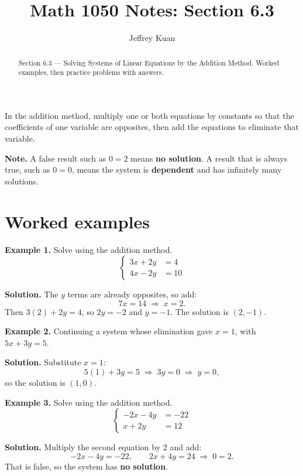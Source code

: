 \documentclass{ximera}
\author{Jeffrey Kuan}
\title{Math 1050 Notes: Section 6.3}
\begin{document}
\begin{abstract}
    Section 6.3 --- Solving Systems of Linear Equations by the Addition Method.
    Worked examples, then practice problems with answers.
\end{abstract}

\maketitle

In the addition method, multiply one or both equations by constants so that the
coefficients of one variable are opposites, then add the equations to eliminate that
variable.

\textbf{Note.} A false result such as $0=2$ means \textbf{no solution}. A result that is
always true, such as $0=0$, means the system is \textbf{dependent} and has infinitely
many solutions.

\section*{Worked examples}

\begin{problem}

\textbf{Example 1.} Solve using the addition method.
\[
  \left\{\begin{aligned}
    3x+2y &= 4 \\
    4x-2y &= 10
  \end{aligned}\right.
\]

\begin{hint}
\textbf{Solution.} The $y$ terms are already opposites, so add:
\[
  7x=14 \;\Longrightarrow\; x=2 .
\]
Then $3(2)+2y=4$, so $2y=-2$ and $y=-1$. The solution is $(2,-1)$.
\end{hint}
\end{problem}

\begin{problem}

\textbf{Example 2.} Continuing a system whose elimination gave $x=1$, with
$5x+3y=5$.

\begin{hint}
\textbf{Solution.} Substitute $x=1$:
\[
  5(1)+3y=5 \;\Longrightarrow\; 3y=0 \;\Longrightarrow\; y=0,
\]
so the solution is $(1,0)$.
\end{hint}
\end{problem}

\begin{problem}

\textbf{Example 3.} Solve using the addition method.
\[
  \left\{\begin{aligned}
    -2x-4y &= -22 \\
    x+2y &= 12
  \end{aligned}\right.
\]

\begin{hint}
\textbf{Solution.} Multiply the second equation by 2 and add:
\[
  -2x-4y=-22, \qquad 2x+4y=24 \;\Longrightarrow\; 0=2 .
\]
That is false, so the system has \textbf{no solution}.
\end{hint}
\end{problem}
\end{document}
